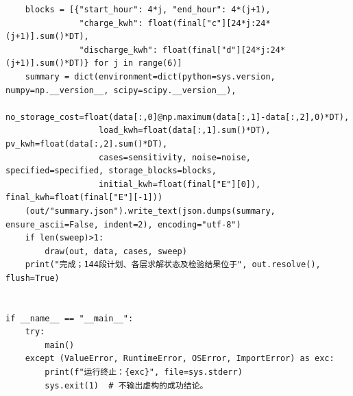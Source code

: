 \documentclass[withoutpreface,bwprint]{cumcmthesis}
\begin{document}
\begin{appendices}
\begin{lstlisting}
    blocks = [{"start_hour": 4*j, "end_hour": 4*(j+1),
               "charge_kwh": float(final["c"][24*j:24*(j+1)].sum()*DT),
               "discharge_kwh": float(final["d"][24*j:24*(j+1)].sum()*DT)} for j in range(6)]
    summary = dict(environment=dict(python=sys.version, numpy=np.__version__, scipy=scipy.__version__),
                   no_storage_cost=float(data[:,0]@np.maximum(data[:,1]-data[:,2],0)*DT),
                   load_kwh=float(data[:,1].sum()*DT), pv_kwh=float(data[:,2].sum()*DT),
                   cases=sensitivity, noise=noise, specified=specified, storage_blocks=blocks,
                   initial_kwh=float(final["E"][0]), final_kwh=float(final["E"][-1]))
    (out/"summary.json").write_text(json.dumps(summary, ensure_ascii=False, indent=2), encoding="utf-8")
    if len(sweep)>1:
        draw(out, data, cases, sweep)
    print("完成；144段计划、各层求解状态及检验结果位于", out.resolve(), flush=True)


if __name__ == "__main__":
    try:
        main()
    except (ValueError, RuntimeError, OSError, ImportError) as exc:
        print(f"运行终止：{exc}", file=sys.stderr)
        sys.exit(1)  # 不输出虚构的成功结论。
\end{lstlisting}

\end{appendices}
\end{document}
